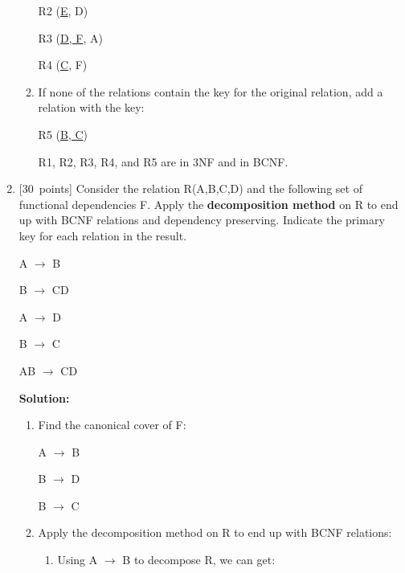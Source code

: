 \begin{enumerate}
\begin{enumerate}
                \hspace{0.75 in} R2 (\underline{E}, D)
                
                \hspace{0.75 in} R3 (\underline{D, F}, A)
                
                \hspace{0.75 in} R4 (\underline{C}, F)
        \item If none of the relations contain the key for the original relation, add a relation with the key:
        
            \hspace{0.75 in} R5 (\underline{B, C})
            
            R1, R2, R3, R4, and R5 are in 3NF and in BCNF.
    \end{enumerate}

\item \mbox{[30 points]}
    Consider the relation R(A,B,C,D) and the following set of functional dependencies F. Apply the {\bf decomposition method} on R to end up with BCNF relations and dependency preserving. Indicate the primary key for each relation in the result.

    \hspace{1 in}A $\rightarrow$ B 

    \hspace{1 in}B $\rightarrow$ CD 
   
    \hspace{1 in}A $\rightarrow$ D
   
    \hspace{1 in}B $\rightarrow$ C

    \hspace{1 in}AB $\rightarrow$ CD
    
	\textbf{Solution:}
	\begin{enumerate}
        \item Find the canonical cover of F:
        
	    \hspace{0.75 in}A $\rightarrow$ B 
	
	    \hspace{0.75 in}B $\rightarrow$ D 
	   
	    \hspace{0.75 in}B $\rightarrow$ C
	    
	    \item Apply the decomposition method on R to end up with BCNF relations:
	        \begin{enumerate}
	            \item Using A $\rightarrow$ B to decompose R, we can get:
	            

\end{enumerate}
\end{enumerate}
\end{enumerate}

